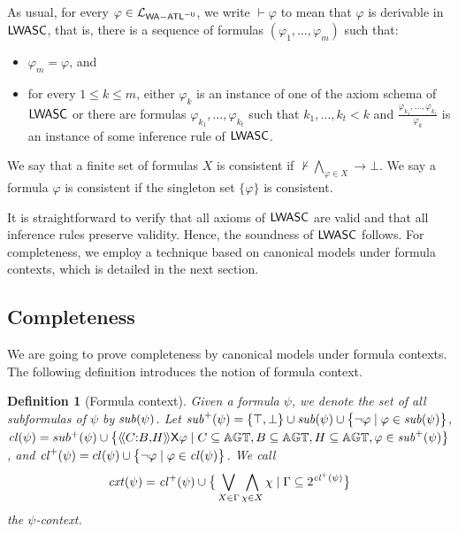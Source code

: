 \documentclass{article}
\newtheorem{definition}{Definition}
\begin{document}
As usual, 
for every  $\varphi \in \mathcal{L}_{\mathsf{WA{-}ATL}^{-\mathsf{U}}}$,
we write $\vdash
\varphi$
to mean that $\varphi $
is derivable  in $\mathsf{LWASC}$,
that is,
there is a sequence of formulas $(\varphi_1, \ldots, \varphi_m)$
such that:
\begin{itemize}
\item $\varphi_m = \varphi$, and
\item for every $1 \leq k \leq m$, either $\varphi_k$
is  an instance of one of the  axiom schema of  $\mathsf{LWASC}$
or there are formulas $\varphi_{k_1}, \ldots ,\varphi_{k_t} $
such that $k_1 , \ldots, k_t < k$  and $\frac{\varphi_{k_1}, \ldots ,\varphi_{k_t} }{\varphi_{k} }$
is an instance of some inference  rule of $\mathsf{LWASC}$.
\end{itemize}
We say that a finite
set of formulas $X$
is consistent if $\not \vdash
\bigwedge_{\varphi \in X}
\rightarrow \bot
$. We say a formula $\varphi$
is consistent
if the singleton set $\{\varphi\}$
is consistent. 

It is straightforward to verify that all axioms of $\mathsf{LWASC}$ are valid and that all inference rules preserve validity. 
Hence, the soundness of $\mathsf{LWASC}$ follows. 
For completeness, we employ a technique based on canonical models under formula contexts, which is detailed in the next section.


\subsection{Completeness }
 We are going
 to prove completeness by canonical models under formula contexts. The following definition introduces the notion of formula context. 
\begin{definition}[Formula context]\label{def: formula context}
Given a formula $\psi $, we denote the set of all subformulas of $\psi $ by $\mathit{sub}(\psi)$. Let $\mathit{sub}^+(\psi ) = \{\top, \bot \}\cup \mathit{sub}(\psi)\cup 
\big\{\neg \varphi \mid \varphi \in \mathit{sub}(\psi ) \big\}$, $\mathit{cl}(\psi) = sub^+(\psi)\cup \big\{\langle\!\langle C{:}B{,}H  \rangle\!\rangle \mathsf{X}\varphi \mid  C\subseteq \mathbb{AGT},B\subseteq \mathbb{AGT},H\subseteq \mathbb{AGT}, \varphi \in \mathit{sub}^+(\psi ) \big\}$, and  $\mathit{cl}^+(\psi) = cl (\psi)\cup \big\{\neg \varphi \mid \varphi \in \mathit{cl}(\psi ) \big\}$. 
We call 
\begin{align*}
   \mathit{cxt}(\psi) = \mathit{cl}^+(\psi)\cup 
\big\{\bigvee_{X\in \Gamma} \bigwedge_{\chi \in X} \chi  \mid  \Gamma\subseteq 2^{\mathit{cl}^+(\psi)} \big\} 
\end{align*}
the $\psi$-context. 
\end{definition}
\end{document}

